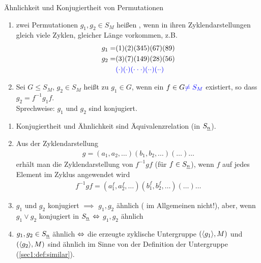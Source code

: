 \begin{definition}
	Ähnlichkeit und Konjugiertheit von Permutationen
	\begin{enumerate}
		\item zwei Permutationen $g_1, g_2 \in S_M$ heißen , wenn in ihren Zyklendarstellungen gleich viele Zyklen, gleicher Länge vorkommen, z.B.
		\begin{align*}
			g_1 =& (1)(2)(345)(67)(89)\\
			g_2 =& (3)(7)(149)(28)(56)\\
				 & \textcolor{blue}{(\cdot)(\cdot)(\cdot\cdot\cdot)(\cdot\cdot)(\cdot\cdot)}
		\end{align*}
		\item Sei $G \le S_M$, $g_2 \in S_M$ heißt  zu $g_1 \in G$, wenn ein $f \in G \textcolor{blue}{\neq S_M}$ existiert, so dass $g_2 = f^{-1}g_1 f$.\\
		Sprechweise: $g_1$ und $g_2$ sind konjugiert.
	\end{enumerate}
\end{definition}
\begin{lemma} %
	\begin{enumerate}
		\item Konjugiertheit und Ähnlichkeit sind Äquivalenzrelation (in $S_{\underline{n}}$).
		\item Aus der Zyklendarstellung
		\begin{align*}
			g = (a_1, a_2, \dots)(b_1, b_2, \dots)(\dots)\dots
		\end{align*}
		erhält man die Zyklendarstellung von $f^{-1}gf$ (für $f \in S_{\underline{n}}$), wenn $f$ auf jedes Element im Zyklus angewendet wird
		\begin{align*}
			f^{-1}gf = (a_1^f, a_2^f, \dots)(b_1^f, b_2^f, \dots)(\dots)\dots
		\end{align*}
		\item $g_1$ und $g_2$ konjugiert $\implies$ $g_1, g_2$ ähnlich (\scyllanote{$\Leftarrow$} im Allgemeinen nicht!), aber, wenn $g_1 \vee g_2$ konjugiert in $S_{\underline{n}}$ $\Leftrightarrow$ $g_1,g_2$ ähnlich
		\item $g_1, g_2 \in S_{\underline{n}}$ ähnlich $\Leftrightarrow$ die erzeugte zyklische Untergruppe $(\langle g_1 \rangle,M)$ und $(\langle g_2 \rangle,M)$ sind ähnlich im Sinne von der Definition der Untergruppe (\cref{sec1:def:similar}).
	\end{enumerate}
\end{lemma}